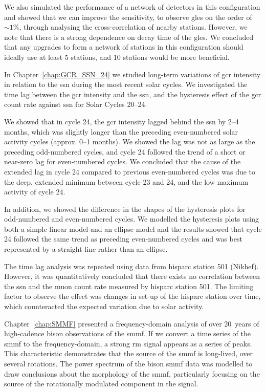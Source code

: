 We also simulated the performance of a network of detectors in this configuration and showed that we can improve the sensitivity, to observe \glspl{gle} on the order of $\sim 1 \%$, through analysing the cross-correlation of nearby stations. However, we note that there is a strong dependence on decay time of the \glspl{gle}. We concluded that any upgrades to form a network of stations in this configuration should ideally use at least 5 stations, and 10 stations would be more beneficial.


\vspace{2em}


In Chapter~\ref{chap:GCR_SSN_24} we studied long-term variations of \gls{gcr} intensity in relation to the \gls{ssn} during the most recent solar cycles. We investigated the time lag between the \gls{gcr} intensity and the \gls{ssn}, and the hysteresis effect of the \gls{gcr} count rate against \gls{ssn} for Solar Cycles 20--24.

We showed that in cycle 24, the \gls{gcr} intensity lagged behind the \gls{ssn} by 2--4 months, which was slightly longer than the preceding even-numbered solar activity cycles (approx. 0--1 months). We showed the lag was not as large as the preceding odd-numbered cycles, and cycle 24 followed the trend of a short or near-zero lag for even-numbered cycles. We concluded that the cause of the extended lag in cycle 24 compared to previous even-numbered cycles was due to the deep, extended minimum between cycle 23 and 24, and the low maximum activity of cycle 24.

In addition, we showed the difference in the shapes of the hysteresis plots for odd-numbered and even-numbered cycles. We modelled the hysteresis plots using both a simple linear model and an ellipse model and the results showed that cycle 24 followed the same trend as preceding even-numbered cycles and was best represented by a straight line rather than an ellipse.

The time lag analysis was repeated using data from \gls{hisparc} station 501 (Nikhef). However, it was quantitatively concluded that there exists no correlation between the \gls{ssn} and the muon count rate measured by \gls{hisparc} station 501. The limiting factor to observe the effect was changes in set-up of the \gls{hisparc} station over time, which counteracted the expected variation due to solar activity.


\vspace{2em}


Chapter~\ref{chap:SMMF} presented a frequency-domain analysis of over 20~years of high-cadence \gls{bison} observations of the \gls{smmf}. If we convert a time series of the \gls{smmf} to the frequency-domain, a strong \gls{rm} signal appears as a series of peaks. This characteristic demonstrates that the source of the \gls{smmf} is long-lived, over several rotations. The power spectrum of the \gls{bison} \gls{smmf} data was modelled to draw conclusions about the morphology of the \gls{smmf}, particularly focusing on the source of the rotationally modulated component in the signal.


